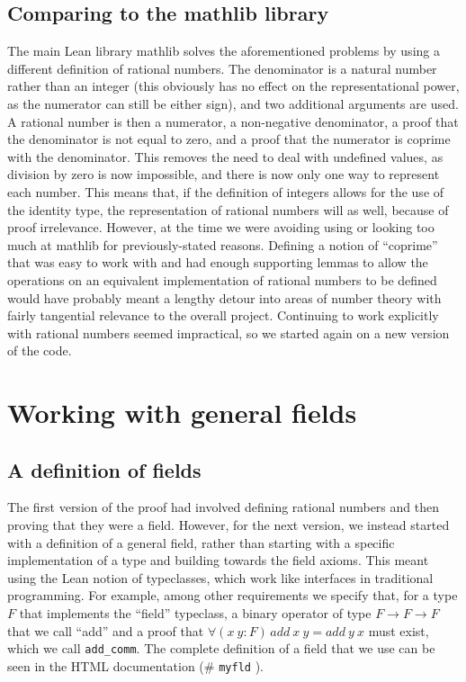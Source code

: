 \documentclass{article} %
\makeatletter
\newcommand{\linkprefix}{id:}
\newcommand{\coqdocbaseurl}{https://NicholasDyson.github.io/non-mathlib/}
\newcommand{\urlhash}{\#}
\newcommand{\coqdocurl}[2]{\coqdocbaseurl #1.html\urlhash #2}
\newcommand{\nolinkcoqident}[1]{\nolinkurl{#1}} %
\newcommand{\coqident}{\begingroup\@makeother\#\@coqident}
\newcommand{\@coqident}[3][]{%
  \ifthenelse{\isempty{#2}}%
  {\nolinkcoqident{#3}}%
  {\ifthenelse{\isempty{#1}}%
  {\href{\coqdocurl{#2}{#3}}{\color{blue}{\nolinkcoqident{\linkprefix #3}}}}%
  {\href{\coqdocurl{#2}{#3}}{\nolinkcoqident{#1}}}}%
\endgroup}
\theoremstyle{plain}
\theoremstyle{definition}
\newcommand{\Lean}{\textsf{Lean}\xspace}
\newcommand{\mathlib}{\textsf{mathlib}\xspace}
\makeatother
\begin{document}
\subsection{Comparing to the \mathlib library}
The main \Lean library \mathlib solves the aforementioned problems by using a different definition of rational numbers.  
The denominator is a natural number rather than an integer (this obviously has no effect on the representational power,
as the numerator can still be either sign), and two additional arguments are used.  
A rational number is then a numerator, a non-negative denominator, a proof that the denominator is not equal to zero,
and a proof that the numerator is coprime with the denominator.  
This removes the need to deal with undefined values, as division by zero is now impossible, and there is now only one way to represent each number.  
This means that, if the definition of integers allows for the use of the identity type, the representation of rational numbers will as well,
because of proof irrelevance.
However, at the time we were avoiding using or looking too much at \mathlib for previously-stated reasons.  
Defining a notion of ``coprime'' that was easy to work with and had enough supporting lemmas
to allow the operations on an equivalent implementation of rational numbers to be defined
would have probably meant a lengthy detour into areas of number theory with fairly tangential relevance to the overall project.  
Continuing to work explicitly with rational numbers seemed impractical, so we started again on a new version of the code.

\section{Working with general fields}
\label{sec:version_two}

\subsection{A definition of fields}
\label{sec:ver_two:field}

The first version of the proof had involved defining rational numbers and then proving that they were a field.
However, for the next version, we instead started with a definition of a general field, rather than starting with a specific implementation of a type and building towards the field axioms.
This meant using the \Lean notion of typeclasses, which work like interfaces in traditional programming.
For example, among other requirements we specify that,
for a type $F$ that implements the ``field'' typeclass, a binary operator of type $F \to F \to F$ that we call ``add''
and a proof that $\forall (x \: y : F)\, add \: x \: y = add \: y \: x$ must exist, which we call \lstinline!add_comm!.
The complete definition of a field that we use can be seen in the HTML documentation (\coqident{field_definition}{myfld}).
\end{document}
